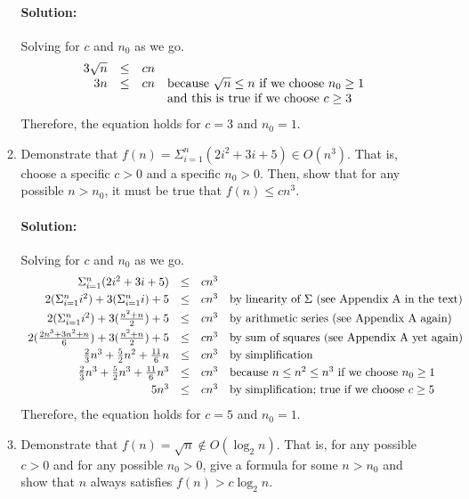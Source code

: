 \documentclass{article}
\begin{document}
\begin{enumerate}
\begin{enumerate}
    \paragraph{Solution:} Solving for \(c\) and \(n_0\) as we go.
    \[
    \begin{array}{rcll}
      3 \sqrt{n} &\leq& cn \\
      3n &\leq& cn
      & $because $ \sqrt{n} \leq n $ if we choose $ n_0 \geq 1 \\
      &&& $and this is true if we choose $ c \geq 3
    \end{array}
    \]
    Therefore, the equation holds for \(c=3\) and \(n_0=1\).

    \bigskip

  \item Demonstrate that
    \(f(n) = \Sigma_{i=1}^{n} (2i^2+3i+5) \in O(n^3)\).
    That is, choose a specific \(c>0\) and a specific \(n_0 > 0\).
    Then, show that for any possible \(n > n_0\), it must be true that
    \(f(n) \leq c n^3\).

    \paragraph{Solution:} Solving for \(c\) and \(n_0\) as we go.
    \[
    \begin{array}{rcll}
      \Sigma_{i=1}^{n} (2i^2+3i+5) &\leq& cn^3 \smallskip \\
      2(\Sigma_{i=1}^{n} i^2) + 3(\Sigma_{i=1}^{n} i) + 5 &\leq& cn^3
      & $by linearity of $ \Sigma $ (see Appendix A in the text)$ \smallskip \\
      2(\Sigma_{i=1}^{n} i^2) + 3(\frac{n^2+n}{2}) + 5 &\leq& cn^3
      & $by arithmetic series (see Appendix A again)$ \smallskip \\
      2(\frac{2n^3+3n^2+n}{6}) + 3(\frac{n^2+n}{2}) + 5 &\leq& cn^3
      & $by sum of squares (see Appendix A yet again)$ \smallskip \\
      \frac{2}{3}n^3 + \frac{5}{2}n^2 + \frac{11}{6}n &\leq& cn^3
      & $by simplification$ \smallskip \\
      \frac{2}{3}n^3 + \frac{5}{2}n^3 + \frac{11}{6}n^3 &\leq& cn^3
      & $because $ n \leq n^2 \leq n^3 $ if we choose $ n_0 \geq 1 \smallskip \\
      5n^3 &\leq& cn^3
      & $by simplification; true if we choose $ c \geq 5
    \end{array}
    \]
    Therefore, the equation holds for \(c=5\) and \(n_0=1\).

    \bigskip

  \item Demonstrate that
    \(f(n) = \sqrt{n} \not\in O(\log_2 n)\).
    That is, for any possible \(c>0\) and for any possible \(n_0 > 0\), give a
    formula for some \(n > n_0\) and show that \(n\) always satisfies
    \(f(n) > c \log_2 n\).

  \end{enumerate}

\end{enumerate}
\end{document}

